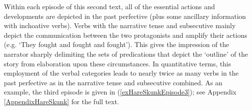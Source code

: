 Within each episode of this second text, all of the essential actions and developments are depicted in the past perfective (plus some ancillary information with inchoative verbs). Verbs with the narrative tense and subsecutive mainly depict the communication between the two protagonists and amplify their actions (e.g. `They fought and fought and fought'). This gives the impression of 
the narrator sharply delimiting the sets of predications that depict the \lq outline' of the story from elaboration upon these circumstances. In quantitative terms, this employment of the verbal categories leads to nearly twice as many verbs in the past perfective as in the narrative tense and subsecutive combined. As an example, the third episode is given in (\ref{exHareSkunkEpisode3}); see Appendix \ref{AppendixHareSkunk} for the full text.

